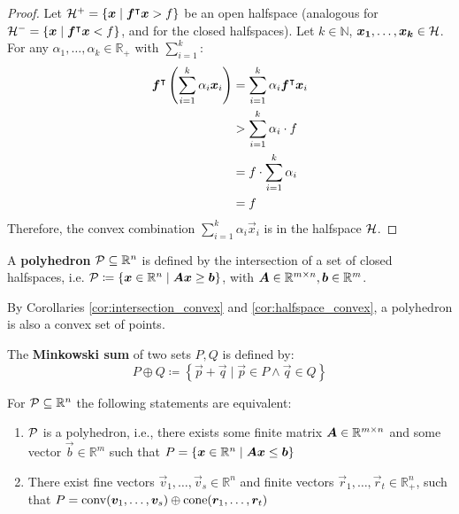 \begin{proof}
Let $\mathcal{H}^+ = \{{\bm{x}} \mid {\bm{f}}^\intercal {\bm{x}} > f\}$ be an open halfspace (analogous for $\mathcal{H}^- = \{{\bm{x}} \mid {\bm{f}}^\intercal {\bm{x}} < f\}$, and for the closed halfspaces). Let $k \in \mathbb{N}$, ${\bm{x_1}}, \dots, {\bm{x_k}} \in \mathcal{H}$. For any $\alpha_1, \dots, \alpha_k \in \mathbb{R}_+$ with $\sum_{i=1}^{k}$:
\begin{align*}
{\bm{f}}^\intercal \left( \sum_{i=1}^{k} \alpha_i {\bm{x}}_i \right)
&= \sum_{i=1}^{k} \alpha_i {\bm{f}}^\intercal {\bm{x}}_i \\
&> \sum_{i=1}^{k} \alpha_i \cdot f \\
&= f \cdot \sum_{i=1}^{k} \alpha_i \\
&= f
\end{align*}
Therefore, the convex combination $\sum_{i=1}^{k} \alpha_i \vec{x}_i$ is in the halfspace $\mathcal{H}$.
\end{proof}

\begin{definition}
A \textbf{polyhedron} $\mathcal{P} \subseteq \mathbb{R}^n$ is defined by the intersection of a set of closed halfspaces, i.e. $\mathcal{P} \coloneqq \{{\bm{x}} \in \mathbb{R}^n \mid {\bm{A}} {\bm{x}} \geq {\bm{b}}\}$, with ${\bm{A}} \in \mathbb{R}^{m \times n}, {\bm{b}} \in \mathbb{R}^m$.

By Corollaries \ref{cor:intersection_convex} and \ref{cor:halfspace_convex}, a polyhedron is also a convex set of points.
\end{definition}


\begin{definition}
The \textbf{Minkowski sum} of two sets $P, Q$ is defined by:
\begin{equation*}
P \oplus Q \coloneqq \left\{\vec{p} + \vec{q} \mid \vec{p} \in P \land \vec{q} \in Q \right\}
\end{equation*}
\end{definition}

\begin{theorem}\label{th:minkowski-weyl}
For $\mathcal{P} \subseteq \mathbb{R}^n$ the following statements are equivalent:
\begin{enumerate}
\item $\mathcal{P}$ is a polyhedron, i.e., there exists some finite matrix ${\bm{A}} \in \mathbb{R}^{m \times n}$ and some vector $\vec{b} \in \mathbb{R}^m$ such that $P = \{{\bm{x}} \in \mathbb{R}^n \mid {\bm{A}} {\bm{x}} \leq {\bm{b}}\}$
\item There exist fine vectors $\vec{v}_1, \dots, \vec{v}_s \in \mathbb{R}^n$ and finite vectors $\vec{r}_1, \dots, \vec{r}_t \in \mathbb{R}_+^n$, such that $P = \operatorname{conv}({\bm{v}}_1, \dots, {\bm{v}}_s) \oplus \operatorname{cone}({\bm{r}}_1, \dots, {\bm{r}}_t)$
\end{enumerate}
\end{theorem}

